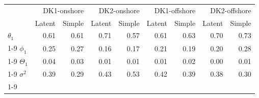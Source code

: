 \begin{table}[htb]
\centering
\begin{tabular}{lrrrrrrrr}
\toprule
 & \multicolumn{2}{r}{DK1-onshore} & \multicolumn{2}{r}{DK2-onshore} & \multicolumn{2}{r}{DK1-offshore} & \multicolumn{2}{r}{DK2-offshore} \\
 & Latent & Simple & Latent & Simple & Latent & Simple & Latent & Simple \\
\midrule
$\theta_1$ & 0.61 & 0.61 & 0.71 & 0.57 & 0.61 & 0.63 & 0.70 & 0.73 \\
\cline{1-9}
$\phi_1$ & 0.25 & 0.27 & 0.16 & 0.17 & 0.21 & 0.19 & 0.20 & 0.28 \\
\cline{1-9}
$\Theta_1$ & 0.04 & 0.03 & 0.01 & 0.01 & 0.01 & 0.02 & 0.00 & 0.01 \\
\cline{1-9}
$\sigma^2$ & 0.39 & 0.29 & 0.43 & 0.53 & 0.42 & 0.39 & 0.38 & 0.30 \\
\cline{1-9}
\bottomrule
\end{tabular}
\end{table}
